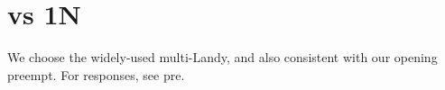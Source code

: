 \section{vs 1N}

We choose the widely-used multi-Landy, and also consistent with our opening preempt.
For responses, see {\color{blue}pre}.


